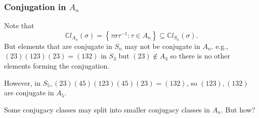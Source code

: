 \documentclass[a4paper]{article}
\begin{document}
      \subsubsection{Conjugation in $A_n$}

      Note that 
      \[
          \mathbb{C}l_{A_n}(\sigma)=\left\{ \tau \sigma\tau^{-1}:\tau\in A_n \right\} \subseteq \mathbb{C}l_{S_n}(\sigma)
      .\]
      But elements that are conjugate in $S_n$ may not be conjugate in $A_n$. e.g., $ (23)(123)(23)=(132) $ in $S_3$ but $ (23)\notin A_3 $ so there is no other elements forming the conjugation.

      However, in $S_5, (23)(45)(123)(45)(23)=(132)$, so $ (123),(132) $ are conjugate in $A_5$.

      Some conjugacy classes may split into smaller conjugacy classes in $A_n$. But how?
\end{document}
